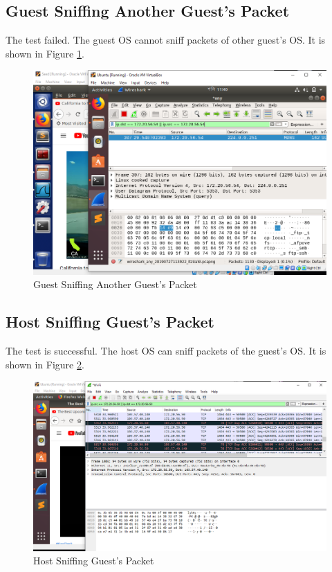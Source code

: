 \documentclass[14pt]{extarticle}
\begin{document}
    \subsection{Guest Sniffing Another Guest's Packet}
        The test failed. The guest OS cannot sniff packets of other guest's OS. It is shown in Figure \ref{fig:vm2vm}.
        \begin{figure}
            \centering
            \includegraphics[width=.95\textwidth]{Pictures/VM1_to_VM2.png}
            \caption{Guest Sniffing Another Guest's Packet}
            \label{fig:vm2vm}
        \end{figure}    
    
    \subsection{Host Sniffing Guest's Packet}
        The test is successful. The host OS can sniff packets of the guest's OS. It is shown in Figure \ref{fig:main2vm}.
        \begin{figure}
            \centering
            \includegraphics[width=.95\textwidth]{Pictures/Main_to_VM1.png}
            \caption{Host Sniffing Guest's Packet}
            \label{fig:main2vm}
        \end{figure}
\end{document}
